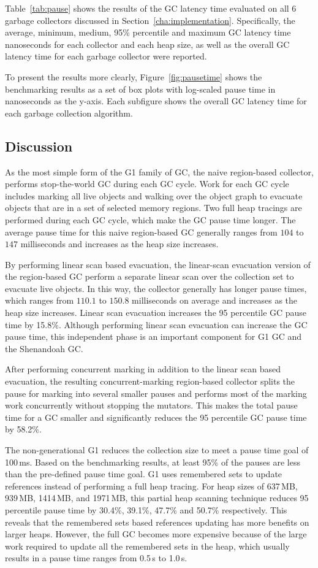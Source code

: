 Table~\ref{tab:pause} shows the results of the GC latency time
evaluated on all 6 garbage collectors discussed in Section~\ref{cha:implementation}.
Specifically, the average, minimum, medium, 95\% percentile and maximum GC latency time nanoseconds
for each collector and each heap size,
as well as the overall GC latency time for each garbage collector
were reported.

To present the results more clearly, Figure~\ref{fig:pausetime} shows
the benchmarking results as a set of box plots with log-scaled pause time in nanoseconds as the y-axis.
Each subfigure shows the overall GC latency time for each garbage collection algorithm.

\subsection{Discussion}

As the most simple form of the G1 family of GC, the naive region-based collector, performs
stop-the-world GC during each GC cycle. Work for each GC cycle includes marking all
live objects and walking over the object graph to evacuate objects that are in a set of selected memory
regions. Two full heap tracings are performed during each GC cycle, which make the GC
pause time longer. The average pause time for this naive region-based GC generally ranges from $104$ to $147$
milliseconds and increases as the heap size increases.

By performing linear scan based evacuation, the linear-scan evacuation version of the region-based
GC perform a separate linear scan over the collection set
to evacuate live objects.
In this way, the collector generally has longer pause times,
which ranges from $110.1$ to $150.8$ milliseconds on average and increases as the heap size increases.
Linear scan evacuation increases the 95 percentile GC pause time by 15.8\%.
Although performing linear scan evacuation can increase the GC pause time,
this independent phase is an important component for G1 GC and the Shenandoah GC.

After performing concurrent marking in addition to the linear scan based evacuation,
the resulting concurrent-marking region-based collector splits the pause for marking into several smaller
pauses and performs most of the marking work concurrently without stopping the mutators.
This makes the total pause time for a GC smaller and significantly reduces the 95 percentile
GC pause time by 58.2\%.

The non-generational G1 reduces the collection size to meet a pause time goal of 100\,ms.
Based on the benchmarking results, at least 95\% of the pauses are less than the pre-defined
pause time goal. G1 uses remembered sets to update references
instead of performing a full heap tracing.
For heap sizes of 637\,MB, 939\,MB, 1414\,MB, and 1971\,MB, this
partial heap scanning technique reduces 95 percentile pause time by 30.4\%, 39.1\%, 47.7\% and 50.7\%
respectively. This reveals that the remembered sets based references updating has more benefits on
larger heaps. However, the full GC becomes more expensive because of the large work required
to update all the remembered sets in the heap, which usually results in a pause time
ranges from 0.5\,s to 1.0\,s.

